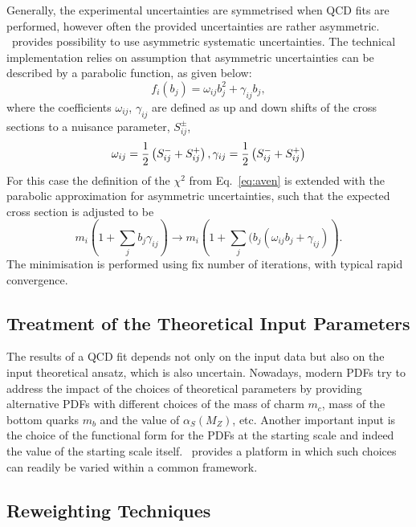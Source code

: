 Generally, the experimental uncertainties are symmetrised when QCD fits 
are performed, however often the provided uncertainties are rather asymmetric.
\fitter\ provides possibility to use asymmetric systematic uncertainties.
The technical implementation relies on assumption that 
asymmetric uncertainties can be described by a parabolic function, as given below:
\begin{equation}
  f_i(b_j)=\omega_{ij}b_j^2 + \gamma_{ij}b_j,
\end{equation}
where the coefficients $\omega_{ij}$, $\gamma_{ij}$ are defined as 
up and down shifts of the cross sections to a nuisance parameter, $S_{ij}^{\pm}$, 
{ \small
\begin{equation}
  \omega_{ij}=\frac{1}{2}\left(S_{ij}^{-}+S_{ij}^{+}\right), \\
  \gamma_{ij}=\frac{1}{2}\left(S_{ij}^{-}+S_{ij}^{+}\right) 
\end{equation}
}
For this case the definition of the $\chi^2$ from Eq.~\ref{eq:aven} is extended with the parabolic approximation 
for asymmetric uncertainties, such that the expected cross section is adjusted to be
\begin{equation}
  m_i(1+\sum_j b_j\gamma_{ij}) \to 
m_i\left(1+\sum_j(b_j(\omega_{ij}b_j + \gamma_{ij})\right).
\end{equation}
The minimisation is performed using ﬁx number of iterations, with typical rapid convergence.





\subsection{Treatment of the Theoretical Input Parameters}

The results of a QCD fit depends not only on the input data but also on the 
input theoretical ansatz, which is also uncertain. Nowadays, modern PDFs 
try to address the impact of the choices of theoretical parameters by providing
alternative PDFs with different choices of the mass of charm $m_c$, mass of the bottom quarks $m_b$ and the value of $\alpha_S(M_Z)$, etc. 
Another important input is the choice of the functional form for the PDFs at the starting scale and indeed the value of the starting scale itself. \fitter\ provides a platform in which such choices can readily be varied within a common framework.

\subsection{Reweighting Techniques}

